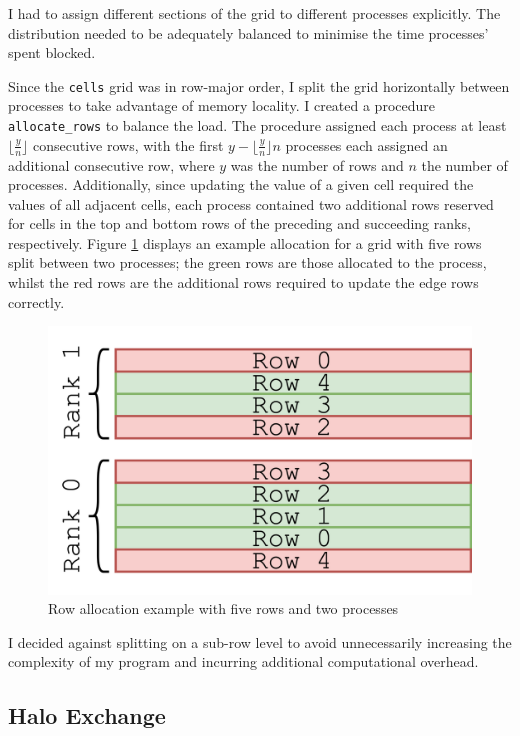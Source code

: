 \documentclass[twocolumn, a4paper]{article}
\begin{document}
I had to assign different sections of the grid to different processes explicitly.
The distribution needed to be adequately balanced to minimise the time processes' spent blocked.

Since the \texttt{cells} grid was in row-major order, I split the grid horizontally between processes to take advantage of memory locality.
I created a procedure \texttt{allocate\_rows} to balance the load.
The procedure assigned each process at least $\lfloor\frac{y}{n}\rfloor$ consecutive rows, with the first $y - \lfloor\frac{y}{n}\rfloor n$ processes each assigned an additional consecutive row, where $y$ was the number of rows and $n$ the number of processes.
Additionally, since updating the value of a given cell required the values of all adjacent cells, each process contained two additional rows reserved for cells in the top and bottom rows of the preceding and succeeding ranks, respectively.
Figure \ref{fig:rows} displays an example allocation for a grid with five rows split between two processes; the green rows are those allocated to the process, whilst the red rows are the additional rows required to update the edge rows correctly.

\begin{figure}[htbp]
  \centering
  \includegraphics[width=.75\linewidth]{rows.png}
  \caption{Row allocation example with five rows and two processes}\label{fig:rows}
\end{figure}

I decided against splitting on a sub-row level to avoid unnecessarily increasing the complexity of my program and incurring additional computational overhead.

\subsection{Halo Exchange}
\end{document}
